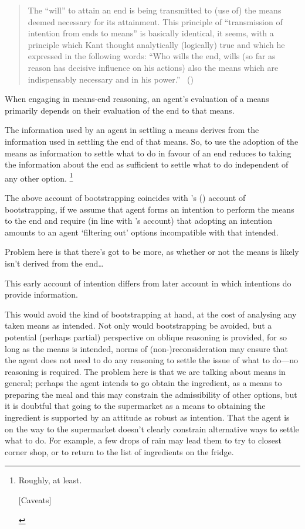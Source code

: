 \documentclass[10pt]{article}
\begin{document}
{\begin{quote}
  The ``will'' to attain an end is being transmitted to (use of) the means deemed necessary for its attainment.
  This principle of ``transmission of intention from ends to means'' is basically identical, it seems, with a principle which Kant thought analytically (logically) true and which he expressed in the following words:
  ``Who wills the end, wills (so far as reason has decisive influence on his actions) also the means which are indispensably necessary and in his power.''\nolinebreak
  \mbox{ }\hfill(\cite[40]{Von-Wright:1972aa})
\end{quote}
}
\begin{principle}\label{princip:dependency}
  When engaging in means-end reasoning, an agent's evaluation of a means primarily depends on their evaluation of the end to that means.
\end{principle}
The information used by an agent in settling a means derives from the information used in settling the end of that means.
So, to use the adoption of the means as information to settle what to do in favour of an end reduces to taking the information about the end as sufficient to settle what to do independent of any other option.\nolinebreak
\footnote{
  Roughly, at least.
  \begin{center}
    [Caveats]
  \end{center}
}

The above account of bootstrapping coincides with \citeauthor{Bratman:1987aa}'s (\citeyear{Bratman:1987aa}) account of bootstrapping, if we assume that agent forms an intention to perform the means to the end and require (in line with \citeauthor{Bratman:1987aa}'s account) that adopting an intention amounts to an agent `filtering out' options incompatible with that intended.

{\color{red} Problem here is that there's got to be more, as whether or not the means is likely isn't derived from the end\dots}

This early account of intention differs from later account in which intentions do provide information.

This would avoid the kind of bootstrapping at hand, at the cost of analysing any taken means as intended.
Not only would bootstrapping be avoided, but a potential (perhaps partial) perspective on oblique reasoning is provided, for so long as the means is intended, norms of (non-)reconsideration may ensure that the agent does not need to do any reasoning to settle the issue of what to do---no reasoning is required.
The problem here is that we are talking about means in general; perhaps the agent intends to go obtain the ingredient, as a means to preparing the meal and this may constrain the admissibility of other options, but it is doubtful that going to the supermarket as a means to obtaining the ingredient is supported by an attitude as robust as intention.
That the agent is on the way to the supermarket doesn't clearly constrain alternative ways to settle what to do.
For example, a few drops of rain may lead them to try to closest corner shop, or to return to the list of ingredients on the fridge.
\end{document}
